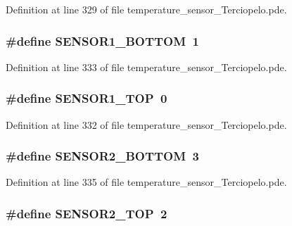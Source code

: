 Definition at line 329 of file temperature\_\-sensor\_\-Terciopelo.pde.\hypertarget{temperature__sensor___terciopelo_8pde_0da2a51dcb3e00b10aedd07d75f22382}{
\subsubsection[{SENSOR1\_\-BOTTOM}]{\setlength{\rightskip}{0pt plus 5cm}\#define SENSOR1\_\-BOTTOM~1}}
\label{temperature__sensor___terciopelo_8pde_0da2a51dcb3e00b10aedd07d75f22382}




Definition at line 333 of file temperature\_\-sensor\_\-Terciopelo.pde.\hypertarget{temperature__sensor___terciopelo_8pde_2a2946288d28852ba343b09fd4f17d7a}{
\subsubsection[{SENSOR1\_\-TOP}]{\setlength{\rightskip}{0pt plus 5cm}\#define SENSOR1\_\-TOP~0}}
\label{temperature__sensor___terciopelo_8pde_2a2946288d28852ba343b09fd4f17d7a}




Definition at line 332 of file temperature\_\-sensor\_\-Terciopelo.pde.\hypertarget{temperature__sensor___terciopelo_8pde_df66e6da6cf8c78004dc0a75fd14d3b1}{
\subsubsection[{SENSOR2\_\-BOTTOM}]{\setlength{\rightskip}{0pt plus 5cm}\#define SENSOR2\_\-BOTTOM~3}}
\label{temperature__sensor___terciopelo_8pde_df66e6da6cf8c78004dc0a75fd14d3b1}




Definition at line 335 of file temperature\_\-sensor\_\-Terciopelo.pde.\hypertarget{temperature__sensor___terciopelo_8pde_645141ae2ab7fa7ac3f690c4959b6baf}{
\subsubsection[{SENSOR2\_\-TOP}]{\setlength{\rightskip}{0pt plus 5cm}\#define SENSOR2\_\-TOP~2}}
\label{temperature__sensor___terciopelo_8pde_645141ae2ab7fa7ac3f690c4959b6baf}




